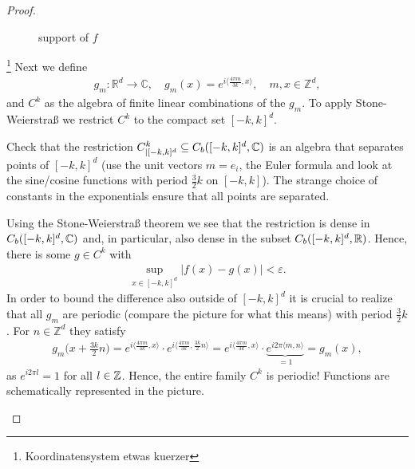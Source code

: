 \begin{proof}[Proof]
\begin{figure}[h]
\begin{center}
			\caption*{support of $f$}
	\end{center}
	\end{figure}
	\footnote{Koordinatensystem etwas kuerzer}
			 Next we define
	\begin{align*}
		g_m \colon \mathbb{R}^d \to \mathbb{C},\quad g_m (x) = e^{ i \langle \frac{4\pi m}{3k}, x \rangle },\quad m, x\in \mathbb{Z}^d,
	\end{align*}
	and $C^k$ as the algebra of finite linear combinations of the $g_m$. To apply Stone-Weierstra\ss{} we restrict $C^k$ to the compact set $[-k,k]^d$.
	\begin{luebung}
		Check that the restriction $C^k_{|[-k,k]^d}\subseteq C_b([-k,k]^d,\mathbb{C})$ is an algebra that separates points of $[-k,k]^d$ (use the unit vectors $m=e_i$, the Euler formula and look at the sine/cosine functions with period $\frac{3}{2} k$ on $[-k,k]$). The strange choice of constants in the exponentials ensure that all points are separated.
	\end{luebung}
	Using the Stone-Weierstra\ss{} theorem we see that the restriction is dense in $C_b([-k,k]^d,\mathbb{C})$ and, in particular, also dense in the subset $C_b([-k,k]^d,\mathbb{R})$. Hence, there is some $g \in C^k$ with 
	\begin{align*}
		\sup_{x\in [-k,k]^d}\lvert f(x) - g(x) \rvert < \varepsilon.
	\end{align*}
	In order to bound the difference also outside of $[-k,k]^d$ it is crucial to realize that all $g_m$ are periodic (compare the picture for what this means) with period $\frac{3}{2}k$. For $n \in \mathbb{Z}^d$ they satisfy
			\begin{align*}
				g_m\Big(x+ \frac{3k}{2} n\Big) = e^{ i \langle \frac{4\pi m}{3k}, x \rangle } \cdot e^{ i \langle \frac{4\pi m}{3k}, \frac{3k}{2} n \rangle } = e^{ i \langle \frac{4\pi m}{3k}, x \rangle } \cdot \underbrace{e^{ i2\pi \langle m,n \rangle }}_{=1} = g_m(x),
			\end{align*}
			as $e^{i 2\pi l}=1$ for all $l\in\mathbb{Z}$.	Hence, the entire family $C^k$ is periodic! Functions are schematically represented in the picture.			
\begin{figure}[h]
	\begin{center}
\end{center}
\end{figure}
\end{proof}
